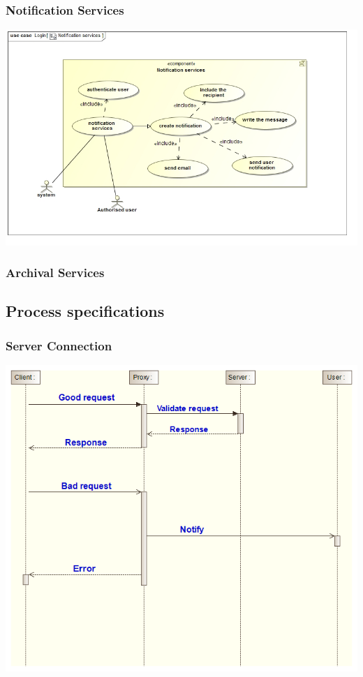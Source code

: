\documentclass[11pt]{article}
\begin{document}
\begin{center}
\subsubsection{Notification Services}
\begin{center} 
	\includegraphics[width=\textwidth]{../Images/NotificationServicesUC.jpg}\\[0.5cm]
\end{center}
\subsubsection{Archival Services}

\newpage

\subsection{Process specifications}

\subsubsection{Server Connection}
\begin{center} 
	\includegraphics[width=\textwidth]{../Images/Server_Connection_Sequence_Diagram.png}\\[0.5cm]
\end{center}


\end{center}
\end{document}
